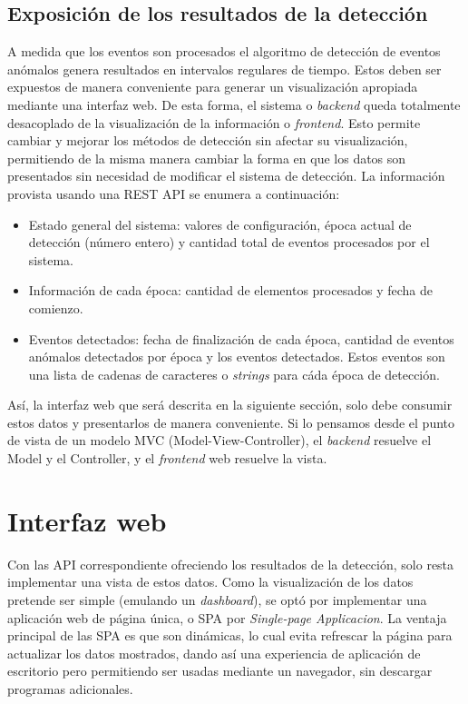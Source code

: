 \documentclass[a4paper,10pt, oneside]{article}
\begin{document}
\subsection{Exposición de los resultados de la detección}
A medida que los eventos son procesados el algoritmo de detección de eventos anómalos genera resultados en intervalos regulares de tiempo. Estos deben ser expuestos de manera conveniente para generar un visualización apropiada mediante una interfaz web. De esta forma, el sistema o \textit{backend} queda totalmente desacoplado de la visualización de la información o \textit{frontend}. Esto permite cambiar y mejorar los métodos de detección sin afectar su visualización, permitiendo de la misma manera cambiar la forma en que los datos son presentados sin necesidad de modificar el sistema de detección.
La información provista usando una REST API se enumera a continuación:
\begin{itemize}
	\item Estado general del sistema: valores de configuración, época actual de detección (número entero) y cantidad total de eventos procesados por el sistema.
	\item Información de cada época:  cantidad de elementos procesados y fecha de comienzo.
	\item Eventos detectados: fecha de finalización de cada época, cantidad de eventos anómalos detectados por época y los eventos detectados. Estos eventos son una lista de cadenas de caracteres o \textit{strings} para cáda época de detección.
\end{itemize}

Así, la interfaz web que será descrita en la siguiente sección, solo debe consumir estos datos y presentarlos de manera conveniente. Si lo pensamos desde el punto de vista de un modelo MVC (Model-View-Controller), el \textit{backend} resuelve el Model y el Controller, y el \textit{frontend} web resuelve la vista.

\section{Interfaz web}
Con las API correspondiente ofreciendo los resultados de la detección, solo resta implementar una vista de estos datos. Como la visualización de los datos pretende ser simple (emulando un \textit{dashboard}), se optó por implementar una aplicación web de página única, o SPA por \textit{Single-page Applicacion}. La ventaja principal de las SPA es que son dinámicas, lo cual evita refrescar la página para actualizar los datos mostrados, dando así una experiencia de aplicación de escritorio pero permitiendo ser usadas mediante un navegador, sin descargar programas adicionales.
\end{document}
